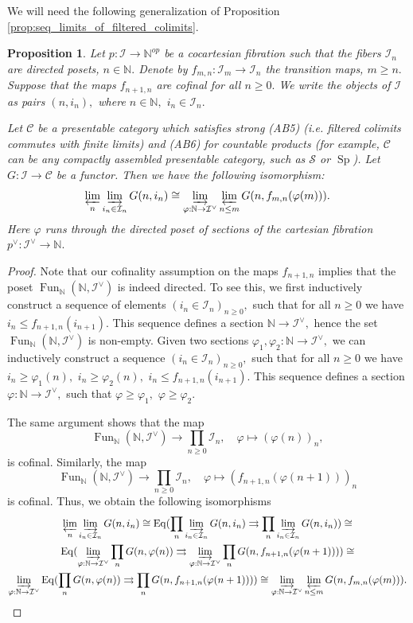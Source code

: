 \documentclass[11pt,leqno]{amsart}
\newtheorem{prop}[theo]{Proposition}
\numberwithin{equation}{section}
\def\N{\mathbb{N}}
\newcommand{\indlim}[1][]{\mathop{\varinjlim}\limits_{#1}}
\newcommand{\prolim}[1][]{\mathop{\varprojlim}\limits_{#1}}
\newcommand{\prodd}[1][]{\mathop{\prod}\limits_{#1}}
\newcommand{\toto}{\rightrightarrows}
\newcommand{\cI}{{\mathcal I}}
\newcommand{\cC}{{\mathcal C}}
\newcommand{\cS}{{\mathcal S}}
\newcommand{\Eq}{\operatorname{Eq}}
\newcommand{\Fun}{\operatorname{Fun}}
\newcommand{\Sp}{\operatorname{Sp}}
\begin{document}
We will need the following generalization of Proposition \ref{prop:seq_limits_of_filtered_colimits}.

\begin{prop}\label{prop:limit_of_colimits_for_fibrations}Let $p:\cI\to\N^{op}$ be a cocartesian fibration such that the fibers $\cI_n$ are directed posets, $n\in\N.$ Denote by $f_{m,n}:\cI_m\to\cI_n$ the transition maps, $m\geq n.$ Suppose that the maps $f_{n+1,n}$ are cofinal for all $n\geq 0.$ We write the objects of $\cI$ as pairs $(n,i_n),$ where $n\in\N,$ $i_n\in\cI_n.$
	
	Let $\cC$ be a presentable category which satisfies strong (AB5) (i.e. filtered colimits commutes with finite limits) and (AB6) for countable products (for example, $\cC$ can be any compactly assembled presentable category, such as $\cS$ or $\Sp$). Let $G:\cI\to\cC$ be a functor. Then we have the following isomorphism:
	$$\prolim[n]\indlim[i_n\in\cI_n]G(n,i_n)\cong \indlim[\varphi:\N\to\cI^{\vee}]\prolim[n\leq m]G(n,f_{m,n}(\varphi(m))).$$
	Here $\varphi$ runs through the directed poset of sections of the cartesian fibration $p^{\vee}:\cI^{\vee}\to\N.$\end{prop}



\begin{proof}Note that our cofinality assumption on the maps $f_{n+1,n}$ implies that the poset $\Fun_{\N}(\N,\cI^{\vee})$ is indeed directed. To see this, we first inductively construct a sequence of elements $(i_n\in \cI_n)_{n\geq 0},$ such that for all $n\geq 0$ we have $i_n\leq f_{n+1,n}(i_{n+1}).$ This sequence defines a section $\N\to\cI^{\vee},$ hence the set $\Fun_{\N}(\N,\cI^{\vee})$ is non-empty. Given two sections $\varphi_1,\varphi_2:\N\to \cI^{\vee},$ we can inductively construct a sequence $(i_n\in \cI_n)_{n\geq 0},$
	such that for all $n\geq 0$ we have $i_n\geq \varphi_1(n),$ $i_n\geq \varphi_2(n),$ $i_n\leq f_{n+1,n}(i_{n+1}).$ This sequence defines a section $\varphi:\N\to\cI^{\vee},$ such that $\varphi\geq \varphi_1,$ $\varphi\geq \varphi_2.$  
	
	The same argument shows that the map $$\Fun_{\N}(\N,\cI^{\vee})\to\prodd[n\geq 0]\cI_n,\quad \varphi\mapsto (\varphi(n))_n,$$ is cofinal. Similarly, the map
	$$\Fun_{\N}(\N,\cI^{\vee})\to\prodd[n\geq 0]\cI_n,\quad \varphi\mapsto (f_{n+1,n}(\varphi(n+1)))_n$$
	is cofinal. Thus, we obtain the following isomorphisms
	\begin{multline*}\prolim[n]\indlim[i_n\in\cI_n]G(n,i_n)\cong\Eq(\prodd[n]\indlim[i_n\in\cI_n]G(n,i_n)\toto \prodd[n]\indlim[i_n\in\cI_n]G(n,i_n))\cong\\ \Eq(\indlim[\varphi:\N\to\cI^{\vee}]\prodd[n]G(n,\varphi(n))\toto \indlim[\varphi:\N\to\cI^{\vee}]\prodd[n]G(n,f_{n+1,n}(\varphi(n+1))))\cong\\
		\indlim[\varphi:\N\to\cI^{\vee}]\Eq(\prodd[n]G(n,\varphi(n))\toto \prodd[n]G(n,f_{n+1,n}(\varphi(n+1))))\cong \indlim[\varphi:\N\to\cI^{\vee}]\prolim[n\leq m]G(n,f_{m,n}(\varphi(m))).\qedhere\end{multline*}\end{proof}
\end{document}
